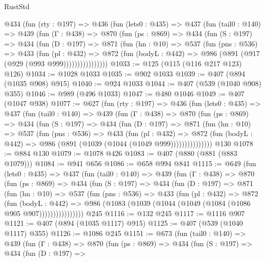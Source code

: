 \begin{lexlean}{RustStd}
\begin{coremodule}
    @434
      (fun (rty : @197) =>
      @436
        (fun (lets0 : @435) =>
        @437
          (fun (tail0 : @140) =>
          @439
            (fun (Γ : @438) =>
            @870
              (fun (ps : @869) =>
              @434
                (fun (S : @197) =>
                @434
                  (fun (D : @197) =>
                  @871
                    (fun (hn : @10) =>
                    @537
                      (fun (pns : @536) =>
                      @433
                        (fun (pl : @432) =>
                        @872
                          (fun (bodyL : @442) => @986 (@891 (@917 (@929 (@993 @999))))))))))))))))
@1033 := @125 (@115 (@116 @217 @123) @126)
@1034 := @1028 @1033
@1035 := @902 @1033
@1039 := @407 (@894 (@1035 @908) @915)
@1040 := @924 @1033
@1044 := @407 (@539 (@1040 @908) @355)
@1046 := @989 (@496 @1033)
@1047 := @480 @1046
@1049 := @407 (@1047 @938)
@1077 := @627
    (fun (rty : @197) =>
    @436
      (fun (lets0 : @435) =>
      @437
        (fun (tail0 : @140) =>
        @439
          (fun (Γ : @438) =>
          @870
            (fun (ps : @869) =>
            @434
              (fun (S : @197) =>
              @434
                (fun (D : @197) =>
                @871
                  (fun (hn : @10) =>
                  @537
                    (fun (pns : @536) =>
                    @433
                      (fun (pl : @432) =>
                      @872
                        (fun (bodyL : @442) => @986 (@891 (@1039 (@1044 (@1049 @999)))))))))))))))
    @130
@1078 := @884 @130
@1079 := @1078 @426
@1083 := @407 (@880 (@881 (@883 @1079)))
@1084 := @941 @656
@1086 := @658 @994 @841
@1115 := @649
    (fun (lets0 : @435) =>
    @437
      (fun (tail0 : @140) =>
      @439
        (fun (Γ : @438) =>
        @870
          (fun (ps : @869) =>
          @434
            (fun (S : @197) =>
            @434
              (fun (D : @197) =>
              @871
                (fun (hn : @10) =>
                @537
                  (fun (pns : @536) =>
                  @433
                    (fun (pl : @432) =>
                    @872
                      (fun (bodyL : @442) =>
                      @986 (@1083 (@1039 (@1044 (@1049 (@1084 (@1086 @905 @907))))))))))))))))
    @245
@1116 := @132 @245
@1117 := @1116 @907
@1121 := @407 (@894 (@1035 @1117) @915)
@1125 := @407 (@539 (@1040 @1117) @355)
@1126 := @1086 @245
@1151 := @673
    (fun (tail0 : @140) =>
    @439
      (fun (Γ : @438) =>
      @870
        (fun (ps : @869) =>
        @434
          (fun (S : @197) =>
          @434
            (fun (D : @197) =>

\end{coremodule}
\end{lexlean}
